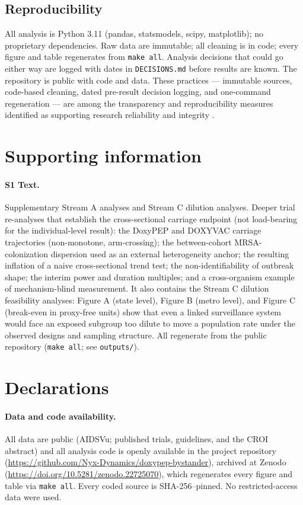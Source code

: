 \documentclass[10pt,letterpaper]{article}
\begin{document}
\subsection*{Reproducibility}

All analysis is Python 3.11 (pandas, statsmodels, scipy, matplotlib); no
proprietary dependencies. Raw data are immutable; all cleaning is in
code; every figure and table regenerates from \texttt{make\ all}.
Analysis decisions that could go either way are logged with dates in
\texttt{DECISIONS.md} before results are known. The repository is public with code and data. These practices --- immutable sources, code-based cleaning, dated pre-result decision logging, and one-command regeneration --- are among the transparency and reproducibility measures identified as supporting research reliability and integrity \cite{armond2024integrity}.


\section*{Supporting information}

\paragraph*{S1 Text.}
\label{S1_Text}
Supplementary Stream A analyses and Stream C dilution analyses. Deeper trial re-analyses that
establish the cross-sectional carriage endpoint (not load-bearing for the individual-level result):
the DoxyPEP and DOXYVAC carriage trajectories (non-monotone, arm-crossing); the between-cohort
MRSA-colonization dispersion used as an external heterogeneity anchor; the resulting inflation of a
naive cross-sectional trend test; the non-identifiability of outbreak shape; the interim power and
duration multiples; and a cross-organism example of mechanism-blind measurement. It also contains the
Stream C dilution feasibility analyses: Figure A (state level), Figure B (metro level), and Figure C
(break-even in proxy-free units) show that even a linked surveillance system would face an exposed
subgroup too dilute to move a population rate under the observed designs and sampling structure. All
regenerate from the public repository (\texttt{make all}; see \texttt{outputs/}).

\section*{Declarations}

\paragraph*{Data and code availability.} All data are public (AIDSVu; published trials, guidelines,
and the CROI abstract) and all analysis code is openly available in the project repository
(\url{https://github.com/Nyx-Dynamics/doxypep-bystander}), archived at Zenodo
(\url{https://doi.org/10.5281/zenodo.22725070}), which regenerates every figure and table via
\texttt{make all}. Every coded source is SHA-256--pinned. No restricted-access data were used.
\end{document}
